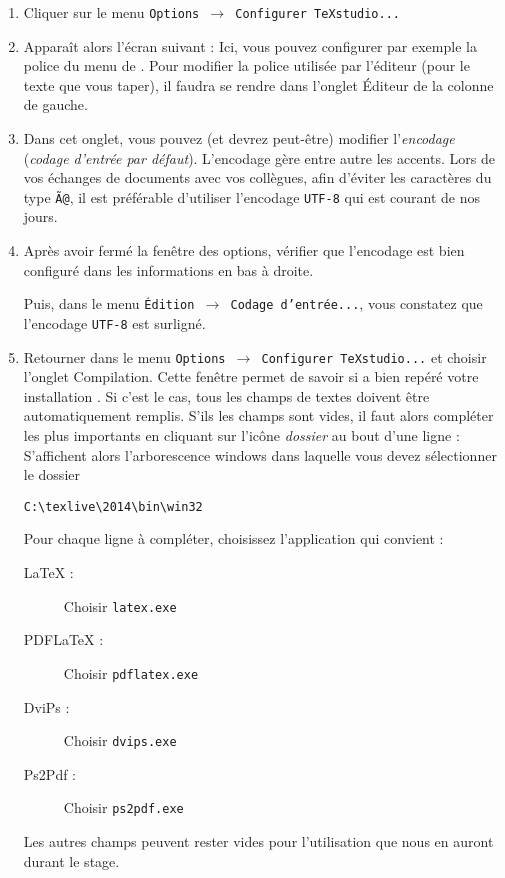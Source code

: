 \begin{enumerate}
	\item Cliquer sur le menu {\tt Options $\rightarrow$ Configurer TeXstudio...}
	\item Apparaît alors l'écran suivant :
	Ici, vous pouvez configurer par exemple la police du menu de \texstudio. Pour modifier la police utilisée par l'éditeur (pour le texte que vous taper), il faudra se rendre dans l'onglet {\sf \'Editeur} de la colonne de gauche.
	\item Dans cet onglet, vous pouvez (et devrez peut-être) modifier l'\textit{encodage} (\textit{codage d'entrée par défaut}). L'encodage gère entre autre les accents. Lors de vos échanges de documents avec vos collègues, afin d'éviter les caractères du type {\tt Ã}\verb|@|, il est préférable d'utiliser l'encodage {\tt UTF-8} qui est courant de nos jours.
	\item Après avoir fermé la fenêtre des options, vérifier que l'encodage est bien configuré dans les informations en bas à droite.\par
        Puis, dans le menu {\tt \'Edition $\rightarrow$ Codage d'entrée...}, vous constatez que l'encodage {\tt UTF-8} est surligné.
    \item Retourner dans le menu {\tt Options $\rightarrow$ Configurer TeXstudio...} et choisir l'onglet {\sf Compilation}. Cette fenêtre permet de savoir si \texstudio a bien repéré votre installation \texlive. Si c'est le cas, tous les champs de textes doivent être automatiquement remplis.
        S'ils les champs sont vides, il faut alors compléter les plus importants en cliquant sur l'icône \textit{dossier} au bout d'une ligne :
        S'affichent alors l'arborescence windows dans laquelle vous devez sélectionner le dossier\par \verb+C:\texlive\2014\bin\win32+\par
        Pour chaque ligne à compléter, choisissez l'application qui convient :
        \begin{description}
            \item[LaTeX :] Choisir \verb+latex.exe+
            \item[PDFLaTeX :] Choisir \verb+pdflatex.exe+
            \item[DviPs :] Choisir \verb+dvips.exe+
            \item[Ps2Pdf :] Choisir \verb+ps2pdf.exe+
        \end{description}
        Les autres champs peuvent rester vides pour l'utilisation que nous en auront durant le stage.
    \end{enumerate}

